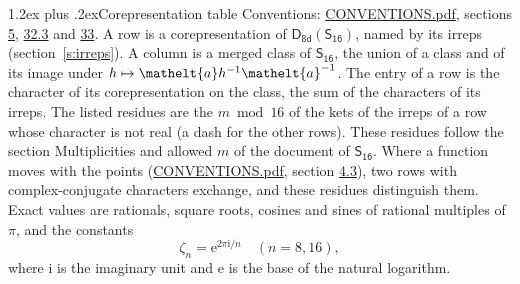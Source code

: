 \documentclass[10pt,a4paper]{article}
\makeatletter
\renewcommand\section{\@startsection{section}{1}{\z@}{-3ex plus -1ex minus -.2ex}%
  {1.2ex plus .2ex}{\normalfont\large\sffamily\bfseries\color{parttitle}}}
\numberwithin{equation}{section}
\newcommand{\eltfont}[1]{{\let\sigma\eltsigma\mathelt{#1}}}
\newcommand{\grp}[1]{\mathsf{#1}}
\newcommand{\elt}[1]{\eltfont{#1}}
\newcommand{\iunit}{\mathrm{i}}
\newcommand{\expe}{\mathrm{e}}
\newcommand{\rootunity}[1]{\zeta_{#1}}
\makeatother
\begin{document}
\section{Corepresentation table}\label{s:character_table}
Conventions: \href{../../CONVENTIONS.pdf}{CONVENTIONS.pdf}, sections \href{../../../rotation/CONVENTIONS.pdf\#conv.5}{5}, \href{../../CONVENTIONS.pdf\#conv.32.3}{32.3} and \href{../../CONVENTIONS.pdf\#conv.33}{33}.
A row is a corepresentation of $\grp{D_{8d}}(\grp{S_{16}})$, named by its irreps (section~\ref{s:irreps}). A column is a merged class of $\grp{S_{16}}$, the union of a class and of its image under $h \mapsto \elt{a} h^{-1} \elt{a}^{-1}$. The entry of a row is the character of its corepresentation on the class, the sum of the characters of its irreps.
\leavevmode\label{n:head.parity}The listed residues are the $m \bmod 16$ of the kets of the irreps of a row whose character is not real (a dash for the other rows). These residues follow the section Multiplicities and allowed $m$ of the document of \href{../../../rotation/data/pdf/S16.pdf}{$\grp{S_{16}}$}. Where a function moves with the points (\href{../../CONVENTIONS.pdf}{CONVENTIONS.pdf}, section \href{../../../rotation/CONVENTIONS.pdf\#conv.4.3}{4.3}), two rows with complex-conjugate characters exchange, and these residues distinguish them.
\leavevmode\label{n:constant.root}\label{n:index.root.order}Exact values are rationals, square roots, cosines and sines of rational multiples of $\pi$, and the constants
\begin{equation}\label{e:constants}\rootunity{n} = \expe^{2\pi\iunit/n}\quad(n = 8, 16),\end{equation}
where $\iunit$ is the imaginary unit and $\expe$ is the base of the natural logarithm.
\end{document}
